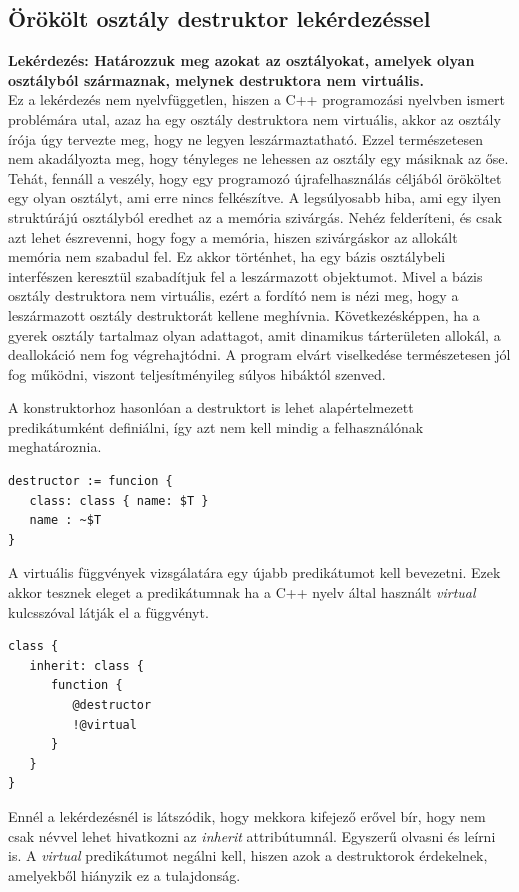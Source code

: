 \documentclass[a4paper,12pt]{report}
\begin{document}
\subsection{Örökölt osztály destruktor lekérdezéssel}
\textbf{Lekérdezés: Határozzuk meg azokat az osztályokat, amelyek olyan osztályból származnak, melynek destruktora nem virtuális.}
\\
Ez a lekérdezés nem nyelvfüggetlen, hiszen a C++ programozási nyelvben ismert problémára utal, azaz ha egy osztály destruktora nem virtuális, akkor az osztály írója úgy tervezte meg, hogy ne legyen leszármaztatható. Ezzel természetesen nem akadályozta meg, hogy tényleges ne lehessen az osztály egy másiknak az őse. Tehát, fennáll a veszély, hogy egy programozó újrafelhasználás céljából örököltet egy olyan osztályt, ami erre nincs felkészítve. A legsúlyosabb hiba, ami egy ilyen struktúrájú osztályból eredhet az a memória szivárgás. Nehéz felderíteni, és csak azt lehet észrevenni, hogy fogy a memória, hiszen szivárgáskor az allokált memória nem szabadul fel. Ez akkor történhet, ha egy bázis osztálybeli interfészen keresztül szabadítjuk fel a leszármazott objektumot. Mivel a bázis osztály destruktora nem virtuális, ezért a fordító nem is nézi meg, hogy a leszármazott osztály destruktorát kellene meghívnia. Következésképpen, ha a gyerek osztály tartalmaz olyan adattagot, amit dinamikus tárterületen allokál, a deallokáció nem fog végrehajtódni. A program elvárt viselkedése természetesen jól fog működni, viszont teljesítményileg súlyos hibáktól szenved.
\par A konstruktorhoz hasonlóan a destruktort is lehet alapértelmezett predikátumként definiálni, így azt nem kell mindig a felhasználónak meghatároznia.
\begin{verbatim}
destructor := funcion {
   class: class { name: $T }
   name : ~$T
}
\end{verbatim}
\par A virtuális függvények vizsgálatára egy újabb predikátumot kell bevezetni. Ezek akkor tesznek eleget a predikátumnak ha a C++ nyelv által használt \textit{virtual} kulcsszóval látják el a függvényt.
\begin{verbatim}
class {
   inherit: class {
      function { 
         @destructor 
         !@virtual 
      }
   }
}
\end{verbatim}
\par Ennél a lekérdezésnél is látszódik, hogy mekkora kifejező erővel bír, hogy nem csak névvel lehet hivatkozni az \textit{inherit} attribútumnál. Egyszerű olvasni és leírni is. A \textit{virtual} predikátumot negálni kell, hiszen azok a destruktorok érdekelnek, amelyekből hiányzik ez a tulajdonság.
\end{document}
